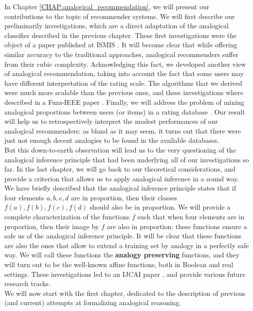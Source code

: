 In Chapter \ref{CHAP:analogical_recommendation}, we will present our
contributions to the topic of recommender systems. We will first describe our
preliminarily investigations, which are a direct adaptation of the analogical
classifier described in the previous chapter. These first investigations were
the object of a paper published at ISMIS \cite{HugPraRicISMIS15}. It will
become clear that while offering similar accuracy to the traditional
approaches, analogical recommenders suffer from their cubic complexity.
Acknowledging this fact, we developed another view of analogical
recommendation, taking into account the fact that some users may have different
interpretation of the rating scale. The algorithms that we derived were much
more scalable than the previous ones, and these investigations where described
in a Fuzz-IEEE paper \cite{HugPraRicSerFuzzIEEE16}.  Finally, we will address
the problem of mining analogical proportions between users (or items) in a
rating database \cite{HugPraRicSerLFA16}. Our result will help us to
retrospectively interpret the modest performances of our analogical
recommenders: as bland as it may seem, it turns out that there were just not
enough decent analogies to be found in the available databases.\\

But this down-to-earth observation will lead us to the very questioning of
the analogical inference principle that had been underlying all of our
investigations so far. In the last chapter, we will go back to our theoretical
considerations, and provide a criterion that allows us to apply analogical
inference in a sound way. We have briefly described that the analogical
inference principle states that if four elements $a, b, c, d$ are in
proportion, then their classes $f(a), f(b), f(c), f(d)$ should also be in
proportion. We will provide a complete characterization of the functions $f$
such that when four elements are in proportion, then their image by $f$ are
also in proportion: these functions ensure a safe us of the analogical
inference principle. It will be clear that these functions are also the ones
that allow to extend a training set by analogy in a perfectly safe way. We will
call these functions the \textbf{analogy preserving} functions, and they will
turn out to be the well-known affine functions, both in Boolean and real
settings. These investigations led to an IJCAI paper
\cite{CouHugPraRicIJCAI17}, and provide various future research tracks.\\


We will now start with the first chapter, dedicated to the description of
previous (and current) attempts at formalizing analogical reasoning.
